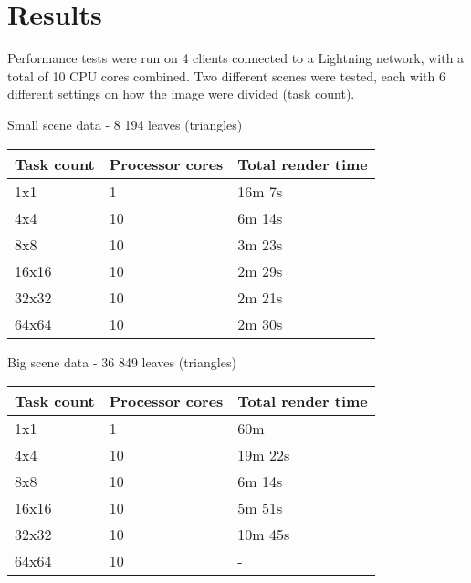 \chapter{Results}

Performance tests were run on 4 clients connected to a Lightning network, with a total of 10 CPU cores combined. Two different scenes were tested, each with 6 different settings on how the image were divided (task count).

\begin{center}
    Small scene data - 8 194 leaves (triangles)
    \begin{tabular}{ | l | l | l |} \hline
    Task count & Processor cores & Total render time \\ \hline
    1x1 & 1 & 16m 7s\\ \hline
    4x4 & 10 & 6m 14s \\ \hline
    8x8 & 10 & 3m 23s \\ \hline
    16x16 & 10 & 2m 29s \\ \hline
    32x32 & 10 & 2m 21s \\ \hline
    64x64 & 10 & 2m 30s \\ \hline
    \end{tabular}
    
    Big scene data - 36 849 leaves (triangles)
    \begin{tabular}{ | l | l | l |} \hline
    Task count & Processor cores & Total render time \\ \hline
    1x1 & 1 & 60m\\ \hline
    4x4 & 10 & 19m 22s \\ \hline
    8x8 & 10 & 6m 14s \\ \hline
    16x16 & 10 & 5m 51s \\ \hline
    32x32 & 10 & 10m 45s \\ \hline
    64x64 & 10 & -\\ \hline
    \end{tabular}
    
    

\end{center}
